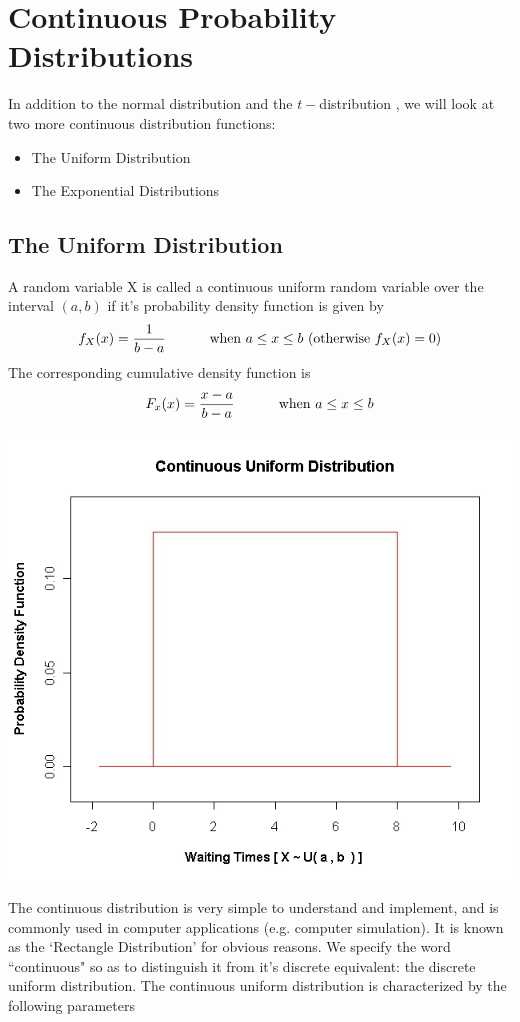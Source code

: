 \documentclass[a4paper,12pt]{article}
\begin{document}
\newpage
\section{Continuous Probability Distributions}
In addition to the normal distribution and the $t-$distribution , we will look at two more continuous distribution functions: 
\begin{itemize}
\item The Uniform Distribution
\item The Exponential Distributions
\end{itemize}
\subsection{The Uniform Distribution}

A random variable X is called a continuous uniform random variable over the interval $(a,b)$ if it's probability density function is given by
\[ f_{X}(x) = { 1 \over b-a} \hspace{1cm} \mbox{ when } a \leq x \leq b \mbox{     (otherwise } f_X(x) = 0 ) \]
The corresponding cumulative density function is
\[ F_x(x) = { x-a \over b-a} \hspace{1cm} \mbox{ when } a \leq x \leq b\]


\begin{center}
\includegraphics[scale=0.35]{6AUniform}
\end{center}
The continuous distribution is very simple to understand and implement, and is commonly used in computer applications (e.g. computer simulation).
It is known as the `Rectangle Distribution' for obvious reasons. We specify the word ``continuous" so as to distinguish it from it's discrete equivalent: the discrete uniform distribution.
The continuous uniform distribution is characterized by the following parameters
\end{document}
